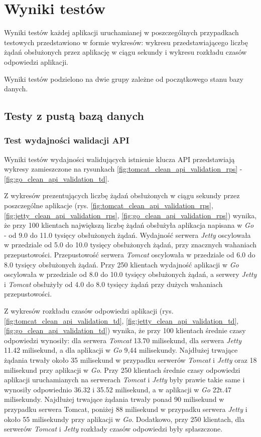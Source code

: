 \chapter{Wyniki testów}
Wyniki testów każdej aplikacji uruchamianej w poszczególnych przypadkach  testowych przedstawiono w formie wykresów: wykresu przedstawiającego liczbę żądań obsłużonych przez aplikację w ciągu sekundy i wykresu rozkładu czasów odpowiedzi aplikacji.

Wyniki testów podzielono na dwie grupy zależne od początkowego stanu bazy danych.

\section{Testy z pustą bazą danych}

\subsection{Test wydajności walidacji API}
Wyniki testów wydajności walidujących istnienie klucza API przedstawiają wykresy zamieszczone na rysunkach \ref{fig:tomcat_clean_api_validation_rps} - \ref{fig:go_clean_api_validation_td}.

Z wykresów prezentujących liczbę żądań obsłużonych w ciągu sekundy przez poszczególne aplikacje (rys. \ref{fig:tomcat_clean_api_validation_rps}, \ref{fig:jetty_clean_api_validation_rps}, \ref{fig:go_clean_api_validation_rps}) wynika, że przy 100 klientach największą liczbę żądań obsłużyła aplikacja napisana w \textsl{Go} - od 9.0 do 11.0 tysięcy obsłużonych żądań. Wydajność serwera \textsl{Jetty} oscylowała w przedziale od 5.0 do 10.0 tysięcy obsłużonych żądań, przy znacznych wahaniach przepustowości. Przepustowość serwera \textsl{Tomcat} oscylowała w przedziale od 6.0 do 8.0 tysięcy obsłużonych żądań. Przy 250 klientach wydajność aplikacji w \textsl{Go} oscylowała w przedziale od 8.0 do 10.0 tysięcy obsłużonych żądań, a serwery \textsl{Jetty} i \textsl{Tomcat} obsłużyły od 4.0 do 8.0 tysięcy żądań przy dużych wahaniach przepustowości.      

Z wykresów rozkładu czasów odpowiedzi aplikacji (rys. \ref{fig:tomcat_clean_api_validation_td}, \ref{fig:jetty_clean_api_validation_td}, \ref{fig:go_clean_api_validation_td}) wynika, że przy 100 klientach średnie czasy odpowiedzi wynosiły: dla serwera \textsl{Tomcat} 13.70 milisekund, dla serwera \textsl{Jetty} 11.42 milisekund, a dla aplikacji w \textsl{Go} 9,44 milisekundy. Najdłużej trwające żądania trwały około 35 milisekund w przypadku serwerów \textsl{Tomcat} i \textsl{Jetty} oraz 18 milisekund przy aplikacji w \textsl{Go}. Przy 250 klientach średnie czasy odpowiedzi aplikacji uruchamianych na serwerach \textsl{Tomcat} i \textsl{Jetty} były prawie takie same i wynosiły odpowiednio 36.32 i 35.52 milisekund, a w aplikacji w \textsl{Go} 22t.47 milisekundy. Najdłużej trwające żądania trwały ponad 90 milisekund w przypadku serwera Tomcat, poniżej 88 milisekund w przypadku serwera \textsl{Jetty} i około 55 milisekundy przy aplikacji w \textsl{Go}. Dodatkowo, przy 250 klientach, dla serwerów \textsl{Tomcat} i \textsl{Jetty} rozkłady czasów odpowiedzi były spłaszczone. 

